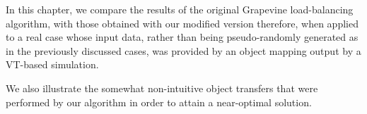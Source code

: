 In this chapter, we compare the results of the original Grapevine load-balancing algorithm,
with those obtained with our modified version therefore, when applied to a real
case whose input data, rather than being pseudo-randomly generated as in the previously
discussed cases, was provided by an object mapping output by a VT-based simulation.

We also illustrate the somewhat non-intuitive object transfers that were performed by our
algorithm in order to attain a near-optimal solution.
